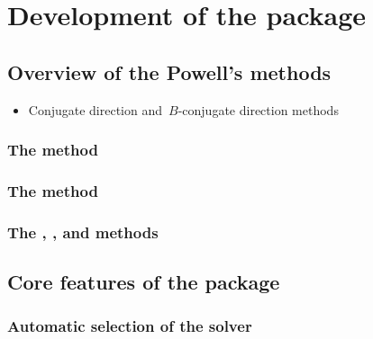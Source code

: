 %
%
%
\chapter{Development of the  package}
\label{ch:pdfo}

\section{Overview of the Powell's  methods}
\label{sec:powell}

\begin{itemize}
    \item Conjugate direction and~$B$-conjugate direction methods~\cite{Powell_1964,Powell_1975a}
\end{itemize}

\subsection{The  method}
\label{subsec:cobyla}

\subsection{The  method}

\subsection{The , , and  methods}
\label{subsec:newuoa-bobyqa-lincoa}

\section{Core features of the  package}

\subsection{Automatic selection of the solver}

